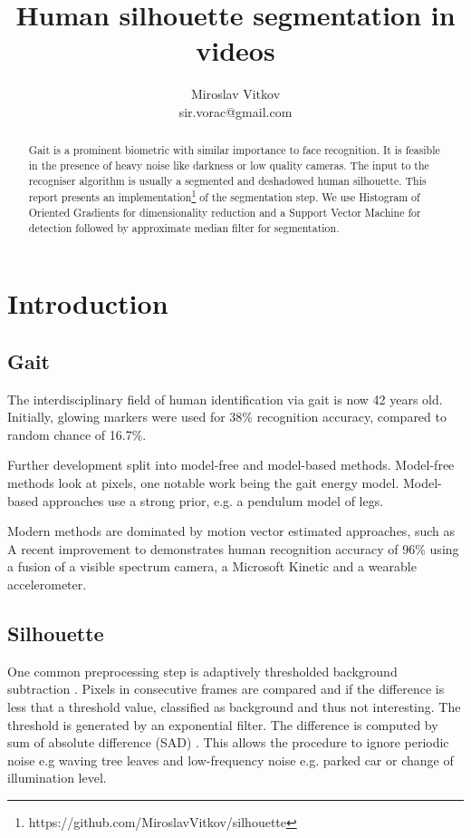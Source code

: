 \documentclass{article}
\title{Human silhouette segmentation in videos}
\author{Miroslav Vitkov \\ sir.vorac@gmail.com}
\begin{document}
\maketitle


\begin{abstract}
Gait is a prominent biometric with similar importance to face recognition.
It is feasible in the presence of heavy noise like darkness or low quality cameras.
The input to the recogniser algorithm is usually a segmented and deshadowed human silhouette.
This report presents an implementation\footnote{https://github.com/MiroslavVitkov/silhouette} of the segmentation step.
We use Histogram of Oriented Gradients for dimensionality reduction and a Support Vector Machine for detection followed by approximate median filter for segmentation.
\end{abstract}


\section{Introduction}
\subsection{Gait}
The interdisciplinary field of human identification via gait is now 42 years old.
Initially, glowing markers were used\cite{begin} for 38\% recognition accuracy, compared to random chance of 16.7\%.

Further development split into model-free and model-based methods.
Model-free methods look at pixels, one notable work being the gait energy model\cite{energy}.
Model-based approaches use a strong prior, e.g. a pendulum model of legs\cite{pendulum}.

Modern methods are dominated by motion vector estimated approaches, such as \cite{pyramid}
A recent improvement to \cite{pyramid} demonstrates human recognition accuracy of 96\% using a fusion of a visible spectrum camera, a Microsoft Kinetic and a wearable accelerometer\cite{robust}.


\subsection{Silhouette}
One common preprocessing step is adaptively thresholded background subtraction \cite{vehicle}.
Pixels in consecutive frames are compared and if the difference is less that a threshold value, classified as background and thus not interesting.
The threshold is generated by an exponential filter.
The difference is computed by sum of absolute difference (SAD) \cite{background}.
This allows the procedure to ignore periodic noise e.g waving tree leaves and low-frequency noise e.g. parked car or change of illumination level.
\end{document}
